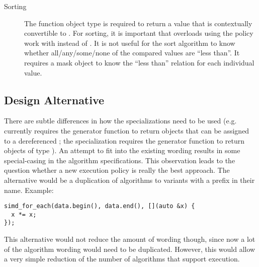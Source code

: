 \begin{description}
  \item[Sorting]
    The  function object type is required to return a value that is contextually convertible to \bool.
    For sorting, it is important that overloads using the \simdEP policy work with  instead of \bool.
    It is not useful for the sort algorithm to know whether all/any/some/none of the compared values are “less than”.
    It requires a mask object to know the “less than” relation for each individual value.
\end{description}

\subsection{Design Alternative}
There are subtle differences in how the \simdEP specializations need to be used
(e.g.  currently requires the generator function to return objects that can be assigned to a dereferenced ;
the \simdEP specialization requires the generator function to return objects of type ).
An attempt to fit \simdEPT into the existing wording results in some special-casing in the algorithm specifications.
This observation leads to the question whether a new execution policy is really the best approach.
The alternative would be a duplication of algorithms to variants with a  prefix in their name.
Example:
\smallskip\begin{lstlisting}[style=Vc]
simd_for_each(data.begin(), data.end(), [](auto &x) {
  x *= x;
});
\end{lstlisting}

This alternative would not reduce the amount of wording though, since now a lot of the algorithm wording would need to be duplicated.
However, this would allow a very simple reduction of the number of algorithms that support \simd execution.


